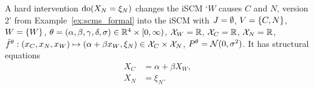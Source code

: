 \begin{Eg}
  A hard intervention $\operatorname{do}(X_N=\xi_N)$ changes the iSCM `$W$ causes $C$ and $N$, version 2' from Example~\ref{ex:scms_formal} into the iSCM with
  $J = \emptyset$, $V = \{C,N\}$, $W = \{W\}$, $\theta = (\alpha,\beta,\gamma,\delta,\sigma) \in \mathbb{R}^4 \times [0,\infty)$, 
  $\mathcal{X}_W = \mathbb{R}$, $\mathcal{X}_C = \mathbb{R}$, $\mathcal{X}_N = \mathbb{R}$, $\tilde{f}^\theta : (x_C, x_N, x_W) \mapsto (\alpha + \beta x_W, \xi_N) \in \mathcal{X}_C \times \mathcal{X}_N$, $P^\theta = \mathcal{N}(0,\sigma^2)$.
  It has structural equations
      \begin{align*}
        X_C & = \alpha + \beta X_W, \\
        X_N & = \xi_N.
      \end{align*}
\end{Eg}

